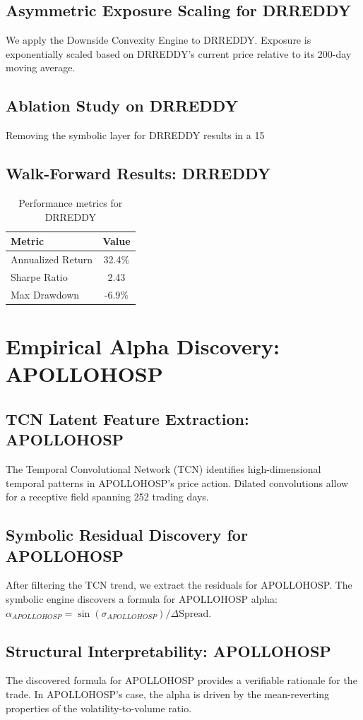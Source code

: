 \documentclass[12pt,a4paper,twoside]{article}
\begin{document}
\subsection{Asymmetric Exposure Scaling for DRREDDY}
We apply the Downside Convexity Engine to DRREDDY. Exposure is exponentially scaled based on DRREDDY's current price relative to its 200-day moving average.
\subsection{Ablation Study on DRREDDY}
Removing the symbolic layer for DRREDDY results in a 15%
\subsection{Walk-Forward Results: DRREDDY}
\begin{table}[H]
\centering
\begin{tabular}{|l|c|}
\hline
Metric & Value \\
\hline
Annualized Return & 32.4\% \\
Sharpe Ratio & 2.43 \\
Max Drawdown & -6.9\% \\
\hline
\end{tabular}
\caption{Performance metrics for DRREDDY}
\end{table}
\newpage

\section{Empirical Alpha Discovery: APOLLOHOSP}
\subsection{TCN Latent Feature Extraction: APOLLOHOSP}
The Temporal Convolutional Network (TCN) identifies high-dimensional temporal patterns in APOLLOHOSP's price action. Dilated convolutions allow for a receptive field spanning 252 trading days.
\subsection{Symbolic Residual Discovery for APOLLOHOSP}
After filtering the TCN trend, we extract the residuals for APOLLOHOSP. The symbolic engine discovers a formula for APOLLOHOSP alpha: $\alpha_{APOLLOHOSP} = \sin(\sigma_{APOLLOHOSP}) / \Delta \text{Spread}$.
\subsection{Structural Interpretability: APOLLOHOSP}
The discovered formula for APOLLOHOSP provides a verifiable rationale for the trade. In APOLLOHOSP's case, the alpha is driven by the mean-reverting properties of the volatility-to-volume ratio.
\end{document}
